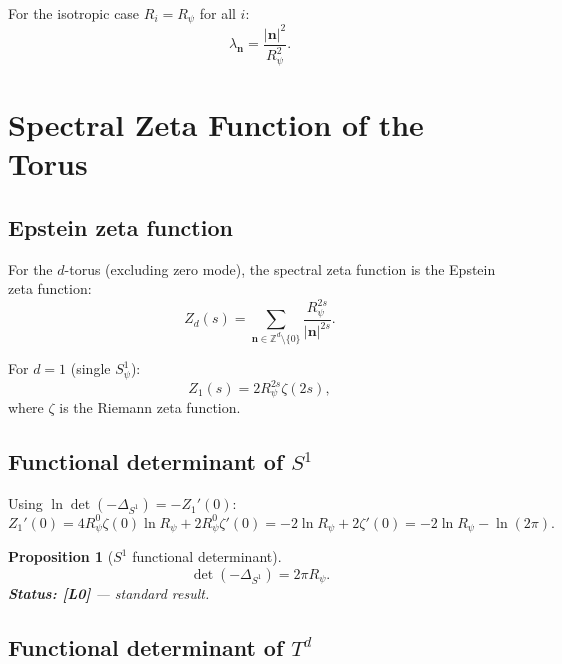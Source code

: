 \documentclass[11pt,a4paper]{article}
\newtheorem{proposition}{Proposition}
\begin{document}
For the isotropic case $R_i = R_\psi$ for all $i$:
\begin{equation}
  \lambda_{\mathbf{n}} = \frac{|\mathbf{n}|^2}{R_\psi^2}.
\end{equation}

\section{Spectral Zeta Function of the Torus}
\label{sec:torus_zeta}

\subsection{Epstein zeta function}

For the $d$-torus (excluding zero mode), the spectral zeta function
is the Epstein zeta function:
\begin{equation}
\label{eq:epstein}
  Z_d(s) = \sum_{\mathbf{n} \in \mathbb{Z}^d \setminus \{0\}}
  \frac{R_\psi^{2s}}{|\mathbf{n}|^{2s}}.
\end{equation}

For $d = 1$ (single $S^1_\psi$):
\begin{equation}
  Z_1(s) = 2 R_\psi^{2s} \zeta(2s),
\end{equation}
where $\zeta$ is the Riemann zeta function.

\subsection{Functional determinant of $S^1$}

Using $\ln\det(-\Delta_{S^1}) = -Z_1'(0)$:
\begin{equation}
  Z_1'(0) = 4 R_\psi^0 \zeta(0)\ln R_\psi + 2 R_\psi^0 \zeta'(0)
  = -2\ln R_\psi + 2\zeta'(0)
  = -2\ln R_\psi - \ln(2\pi).
\end{equation}

\begin{proposition}[$S^1$ functional determinant]\label{prop:s1_det}
  \begin{equation}
    \det(-\Delta_{S^1}) = 2\pi R_\psi.
  \end{equation}
  \textbf{Status: [L0]} — standard result.
\end{proposition}

\subsection{Functional determinant of $T^d$}
\end{document}
